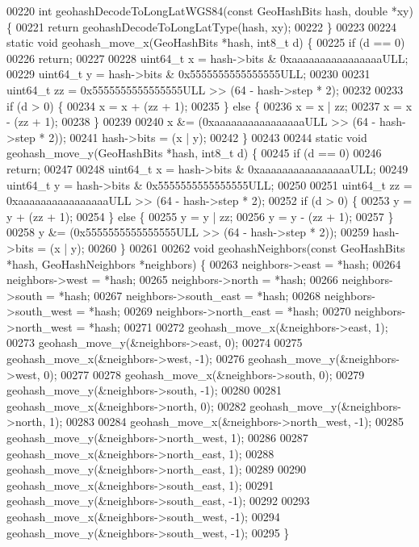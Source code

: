 \begin{DoxyCode}
00220 \textcolor{keywordtype}{int} geohashDecodeToLongLatWGS84(\textcolor{keyword}{const} GeoHashBits hash, \textcolor{keywordtype}{double} *xy) \{
00221     \textcolor{keywordflow}{return} geohashDecodeToLongLatType(hash, xy);
00222 \}
00223 
00224 \textcolor{keyword}{static} \textcolor{keywordtype}{void} geohash\_move\_x(GeoHashBits *hash, int8\_t d) \{
00225     \textcolor{keywordflow}{if} (d == 0)
00226         \textcolor{keywordflow}{return};
00227 
00228     uint64\_t x = hash->bits & 0xaaaaaaaaaaaaaaaaULL;
00229     uint64\_t y = hash->bits & 0x5555555555555555ULL;
00230 
00231     uint64\_t zz = 0x5555555555555555ULL >> (64 - hash->step * 2);
00232 
00233     \textcolor{keywordflow}{if} (d > 0) \{
00234         x = x + (zz + 1);
00235     \} \textcolor{keywordflow}{else} \{
00236         x = x | zz;
00237         x = x - (zz + 1);
00238     \}
00239 
00240     x &= (0xaaaaaaaaaaaaaaaaULL >> (64 - hash->step * 2));
00241     hash->bits = (x | y);
00242 \}
00243 
00244 \textcolor{keyword}{static} \textcolor{keywordtype}{void} geohash\_move\_y(GeoHashBits *hash, int8\_t d) \{
00245     \textcolor{keywordflow}{if} (d == 0)
00246         \textcolor{keywordflow}{return};
00247 
00248     uint64\_t x = hash->bits & 0xaaaaaaaaaaaaaaaaULL;
00249     uint64\_t y = hash->bits & 0x5555555555555555ULL;
00250 
00251     uint64\_t zz = 0xaaaaaaaaaaaaaaaaULL >> (64 - hash->step * 2);
00252     \textcolor{keywordflow}{if} (d > 0) \{
00253         y = y + (zz + 1);
00254     \} \textcolor{keywordflow}{else} \{
00255         y = y | zz;
00256         y = y - (zz + 1);
00257     \}
00258     y &= (0x5555555555555555ULL >> (64 - hash->step * 2));
00259     hash->bits = (x | y);
00260 \}
00261 
00262 \textcolor{keywordtype}{void} geohashNeighbors(\textcolor{keyword}{const} GeoHashBits *hash, GeoHashNeighbors *neighbors) \{
00263     neighbors->east = *hash;
00264     neighbors->west = *hash;
00265     neighbors->north = *hash;
00266     neighbors->south = *hash;
00267     neighbors->south\_east = *hash;
00268     neighbors->south\_west = *hash;
00269     neighbors->north\_east = *hash;
00270     neighbors->north\_west = *hash;
00271 
00272     geohash\_move\_x(&neighbors->east, 1);
00273     geohash\_move\_y(&neighbors->east, 0);
00274 
00275     geohash\_move\_x(&neighbors->west, -1);
00276     geohash\_move\_y(&neighbors->west, 0);
00277 
00278     geohash\_move\_x(&neighbors->south, 0);
00279     geohash\_move\_y(&neighbors->south, -1);
00280 
00281     geohash\_move\_x(&neighbors->north, 0);
00282     geohash\_move\_y(&neighbors->north, 1);
00283 
00284     geohash\_move\_x(&neighbors->north\_west, -1);
00285     geohash\_move\_y(&neighbors->north\_west, 1);
00286 
00287     geohash\_move\_x(&neighbors->north\_east, 1);
00288     geohash\_move\_y(&neighbors->north\_east, 1);
00289 
00290     geohash\_move\_x(&neighbors->south\_east, 1);
00291     geohash\_move\_y(&neighbors->south\_east, -1);
00292 
00293     geohash\_move\_x(&neighbors->south\_west, -1);
00294     geohash\_move\_y(&neighbors->south\_west, -1);
00295 \}
\end{DoxyCode}
